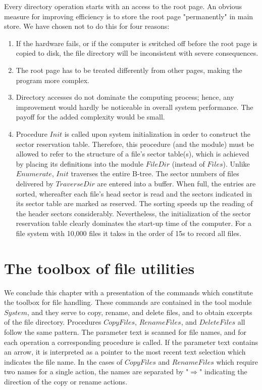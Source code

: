Every directory operation starts with an access to the root page. An obvious measure for
improving efficiency is to store the root page "permanently" in main store. We have chosen not to
do this for four reasons:
\begin{enumerate}
	\item If the hardware fails, or if the computer is switched off before the root page is copied to disk,
the file directory will be inconsistent with severe consequences.
	\item The root page has to be treated differently from other pages, making the program more
complex.
	\item Directory accesses do not dominate the computing process; hence, any improvement would
hardly be noticeable in overall system performance. The payoff for the added complexity would
be small.
	\item Procedure $Init$ is called upon system initialization in order to construct the sector reservation
table. Therefore, this procedure (and the module) must be allowed to refer to the structure of a
file's sector table(s), which is achieved by placing its definitions into the module $FileDir$ (instead of
$Files$). Unlike $Enumerate$, $Init$ traverses the entire B-tree. The sector numbers of files delivered by
$TraverseDir$ are entered into a buffer. When full, the entries are sorted, whereafter each file's
head sector is read and the sectors indicated in its sector table are marked as reserved. The
sorting speeds up the reading of the header sectors considerably. Nevertheless, the initialization
of the sector reservation table clearly dominates the start-up time of the computer. For a file
system with 10,000 files it takes in the order of 15s to record all files.
\end{enumerate}

\section{The toolbox of file utilities}
We conclude this chapter with a presentation of the commands which constitute the toolbox for
file handling. These commands are contained in the tool module $System$, and they serve to copy,
rename, and delete files, and to obtain excerpts of the file directory.
Procedures $CopyFiles$, $RenameFiles$, and $DeleteFiles$ all follow the same pattern. The parameter
text is scanned for file names, and for each operation a corresponding procedure is called. If the
parameter text contains an arrow, it is interpreted as a pointer to the most recent text selection
which indicates the file name. In the cases of $CopyFiles$ and $RenameFiles$ which require two
names for a single action, the names are separated by "$\Rightarrow$" indicating the direction of the copy or
rename actions.

